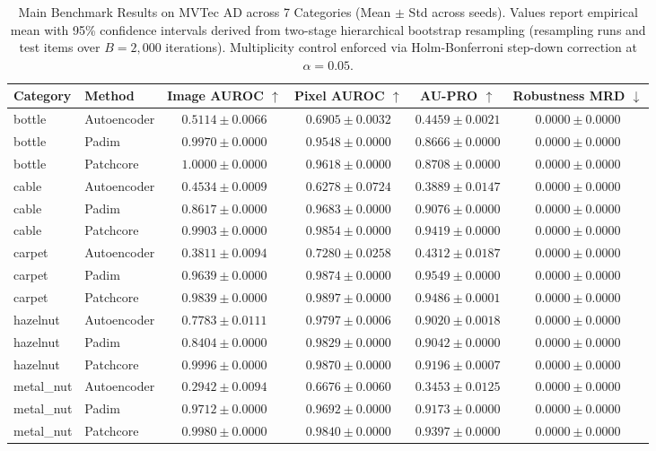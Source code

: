 \begin{table}[t]
\centering
\small
\caption{Main Benchmark Results on MVTec AD across 7 Categories (Mean $\pm$ Std across seeds). Values report empirical mean with 95\% confidence intervals derived from two-stage hierarchical bootstrap resampling (resampling runs and test items over $B = 2,000$ iterations). Multiplicity control enforced via Holm-Bonferroni step-down correction at $\alpha = 0.05$.}
\label{tab:main_results}
\begin{tabular}{llcccc}
\toprule
\textbf{Category} & \textbf{Method} & \textbf{Image AUROC} $\uparrow$ & \textbf{Pixel AUROC} $\uparrow$ & \textbf{AU-PRO} $\uparrow$ & \textbf{Robustness MRD} $\downarrow$ \\
\midrule
bottle & Autoencoder & $0.5114 \pm 0.0066$ & $0.6905 \pm 0.0032$ & $0.4459 \pm 0.0021$ & $0.0000 \pm 0.0000$ \\
bottle & Padim & $0.9970 \pm 0.0000$ & $0.9548 \pm 0.0000$ & $0.8666 \pm 0.0000$ & $0.0000 \pm 0.0000$ \\
bottle & Patchcore & $1.0000 \pm 0.0000$ & $0.9618 \pm 0.0000$ & $0.8708 \pm 0.0000$ & $0.0000 \pm 0.0000$ \\
\midrule
cable & Autoencoder & $0.4534 \pm 0.0009$ & $0.6278 \pm 0.0724$ & $0.3889 \pm 0.0147$ & $0.0000 \pm 0.0000$ \\
cable & Padim & $0.8617 \pm 0.0000$ & $0.9683 \pm 0.0000$ & $0.9076 \pm 0.0000$ & $0.0000 \pm 0.0000$ \\
cable & Patchcore & $0.9903 \pm 0.0000$ & $0.9854 \pm 0.0000$ & $0.9419 \pm 0.0000$ & $0.0000 \pm 0.0000$ \\
\midrule
carpet & Autoencoder & $0.3811 \pm 0.0094$ & $0.7280 \pm 0.0258$ & $0.4312 \pm 0.0187$ & $0.0000 \pm 0.0000$ \\
carpet & Padim & $0.9639 \pm 0.0000$ & $0.9874 \pm 0.0000$ & $0.9549 \pm 0.0000$ & $0.0000 \pm 0.0000$ \\
carpet & Patchcore & $0.9839 \pm 0.0000$ & $0.9897 \pm 0.0000$ & $0.9486 \pm 0.0001$ & $0.0000 \pm 0.0000$ \\
\midrule
hazelnut & Autoencoder & $0.7783 \pm 0.0111$ & $0.9797 \pm 0.0006$ & $0.9020 \pm 0.0018$ & $0.0000 \pm 0.0000$ \\
hazelnut & Padim & $0.8404 \pm 0.0000$ & $0.9829 \pm 0.0000$ & $0.9042 \pm 0.0000$ & $0.0000 \pm 0.0000$ \\
hazelnut & Patchcore & $0.9996 \pm 0.0000$ & $0.9870 \pm 0.0000$ & $0.9196 \pm 0.0007$ & $0.0000 \pm 0.0000$ \\
\midrule
metal_nut & Autoencoder & $0.2942 \pm 0.0094$ & $0.6676 \pm 0.0060$ & $0.3453 \pm 0.0125$ & $0.0000 \pm 0.0000$ \\
metal_nut & Padim & $0.9712 \pm 0.0000$ & $0.9692 \pm 0.0000$ & $0.9173 \pm 0.0000$ & $0.0000 \pm 0.0000$ \\
metal_nut & Patchcore & $0.9980 \pm 0.0000$ & $0.9840 \pm 0.0000$ & $0.9397 \pm 0.0000$ & $0.0000 \pm 0.0000$ \\
\bottomrule
\end{tabular}
\end{table}
